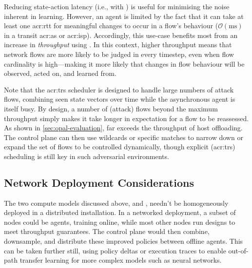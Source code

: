 
Reducing state-action latency (i.e., with \Coopfw) is useful for minimising the noise inherent in learning.
However, an agent is limited by the fact that it can take at least one \gls{acr:rtt} for meaningful changes to occur in a flow's behaviour ($\mathcal{O}{\left(\si{\milli\second}\right)}$ in a transit \gls{acr:as} or \gls{acr:isp}).
Accordingly, this use-case benefits most from an increase in \emph{throughput} using \Indfw{}.
In this context, higher throughput means that network flows are more likely to be judged in every timestep, even when flow cardinality is high---making it more likely that changes in flow behaviour will be observed, acted on, and learned from.

Note that the \gls{acr:trs} scheduler is designed to handle large numbers of attack flows, combining seen state vectors over time while the asynchronous agent is itself busy.
By design, a number of (attack) flows beyond the maximum throughput simply makes it take longer in expectation for a flow to be reassessed.
As shown in \cref{sec:opal-evaluation}, \approachshort{} far exceeds the throughput of host offloading.
The control plane can then use wildcards or specific matches to narrow down or expand the set of flows to be controlled dynamically, though explicit (\gls{acr:trs}) scheduling is still key in such adversarial environments.


\subsection{Network Deployment Considerations}
The two compute models discussed above, \coopfw{} and \indfw{}, needn't be homogeneously deployed in a distributed installation.
In a networked deployment, a subset of \approachshort{} nodes could be \coopfw{} agents, training online, while most other nodes run \indfw{} designs to meet throughput guarantees.
The control plane would then combine, downsample, and distribute these improved policies between offline agents.
This can be taken further still, using policy deltas or execution traces to enable out-of-path transfer learning for more complex models such as neural networks.